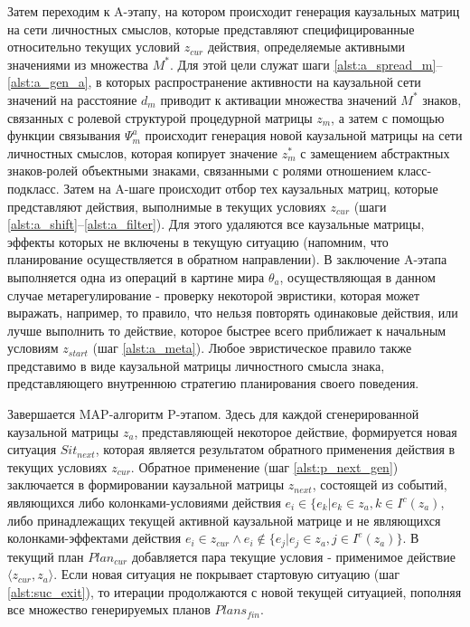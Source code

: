 \documentclass[12pt]{scrartcl}
\newcommand{\linesprval}{1}
\begin{document}
	Затем переходим к A-этапу, на котором происходит генерация каузальных матриц на сети личностных смыслов, которые представляют специфицированные относительно текущих условий $z_{cur}$ действия, определяемые активными значениями из множества $M^*$. Для этой цели служат шаги \ref{alst:a_spread_m}--\ref{alst:a_gen_a}, в которых распространение активности на каузальной сети значений на расстояние $d_m$ приводит к активации множества значений $M^*$ знаков, связанных с ролевой структурой процедурной матрицы $z_m$, а затем с помощью функции связывания $\Psi_m^a$ происходит генерация новой каузальной матрицы на сети личностных смыслов, которая копирует значение $z_m^*$ с замещением абстрактных знаков-ролей объектными знаками, связанными с ролями отношением класс-подкласс. Затем на A-шаге происходит отбор тех каузальных матриц, которые представляют действия, выполнимые в текущих условиях $z_{cur}$ (шаги \ref{alst:a_shift}--\ref{alst:a_filter}). Для этого удаляются все каузальные матрицы, эффекты которых не включены в текущую ситуацию (напомним, что планирование осуществляется в обратном направлении). В заключение A-этапа выполняется одна из операций в картине мира $\theta_a$, осуществляющая в данном случае метарегулирование - проверку некоторой эвристики, которая может выражать, например, то правило, что нельзя повторять одинаковые действия, или лучше выполнить то действие, которое быстрее всего приближает к начальным условиям $z_{start}$ (шаг \ref{alst:a_meta}). Любое эвристическое правило также представимо в виде каузальной матрицы личностного смысла знака, представляющего внутреннюю стратегию планирования своего поведения.

	\linespread{1}	
	\begin{algorithm}
		\begin{algorithmic}[1]
			
		\end{algorithmic}
	\end{algorithm}
	\linespread{\linesprval}

	Завершается MAP-алгоритм P-этапом. Здесь для каждой сгенерированной каузальной матрицы $z_a$, представляющей некоторое действие, формируется новая ситуация $Sit_{next}$, которая является результатом обратного применения действия в текущих условиях $z_{cur}$. Обратное применение (шаг \ref{alst:p_next_gen}) заключается в формировании каузальной матрицы $z_{next}$, состоящей из событий, являющихся либо колонками-условиями действия $e_i\in\{e_k|e_k\in z_a, k\in I^c(z_a)$, либо принадлежащих текущей активной каузальной матрице и не являющихся колонками-эффектами действия $e_i\in z_{cur} \land e_i\not\in\{e_j|e_j\in z_a, j\in I^e(z_a)\}$. В текущий план $Plan_{cur}$ добавляется пара текущие условия - применимое действие $\langle z_{cur}, z_a\rangle$. Если новая ситуация не покрывает стартовую ситуацию (шаг \ref{alst:suc_exit}), то итерации продолжаются с новой текущей ситуацией, пополняя все множество генерируемых планов $Plans_{fin}$.
	
\end{document}
